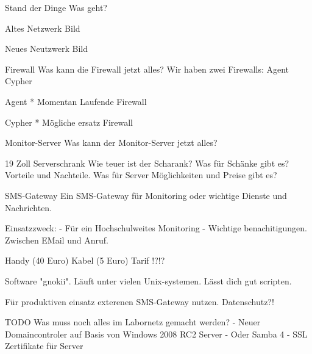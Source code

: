 \documentclass{beamer}
\author[J. Klemkow und B. Franzke]{Jan Klemkow und Benjamin Franzke}
\begin{document}
\begin{frame}{Stand der Dinge}
	Was geht?
\end{frame}

\begin{frame}{Altes Netzwerk}
	Bild
\end{frame}

\begin{frame}{Neues Neutzwerk}
	Bild
\end{frame}

\begin{frame}{Firewall}
	Was kann die Firewall jetzt alles?
	Wir haben zwei Firewalls:
		Agent
		Cypher
\end{frame}

\begin{frame}{Agent}
	* Momentan Laufende Firewall
\end{frame}

\begin{frame}{Cypher}
	* Mögliche ersatz Firewall
\end{frame}

\begin{frame}{Monitor-Server}
	Was kann der Monitor-Server jetzt alles?

\end{frame}

\begin{frame}{19 Zoll Serverschrank}
	Wie teuer ist der Scharank?
	Was für Schänke gibt es?
	Vorteile und Nachteile.
	Was für Server Möglichkeiten und Preise gibt es?
\end{frame}

\begin{frame}{SMS-Gateway}
	Ein SMS-Gateway für Monitoring oder wichtige Dienste und Nachrichten.

	Einsatzzweck:
		- Für ein Hochschulweites Monitoring
		- Wichtige benachitigungen. Zwischen EMail und Anruf.

	Handy (40 Euro)
	Kabel (5 Euro)
	Tarif !?!?

	Software "gnokii".
	Läuft unter vielen Unix-systemen.
	Lässt dich gut scripten.

	Für produktiven einsatz exterenen SMS-Gateway nutzen.
	Datenschutz?!
\end{frame}

\begin{frame}{TODO}
	Was muss noch alles im Labornetz gemacht werden?
	- Neuer Domaincontroler auf Basis von Windows 2008 RC2 Server
	- Oder Samba 4
	- SSL Zertifikate für Server
\end{frame}
\end{document}
